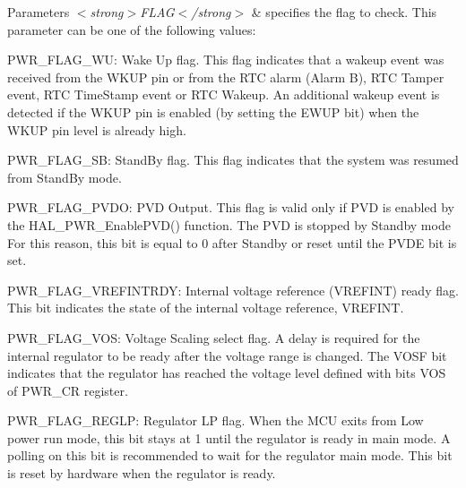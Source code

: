 \begin{DoxyParams}{Parameters}
{\em $<$strong$>$\-F\-L\-A\-G$<$/strong$>$} & specifies the flag to check. This parameter can be one of the following values\-: \begin{DoxyItemize}
\item P\-W\-R\-\_\-\-F\-L\-A\-G\-\_\-\-W\-U\-: Wake Up flag. This flag indicates that a wakeup event was received from the W\-K\-U\-P pin or from the R\-T\-C alarm (Alarm B), R\-T\-C Tamper event, R\-T\-C Time\-Stamp event or R\-T\-C Wakeup. An additional wakeup event is detected if the W\-K\-U\-P pin is enabled (by setting the E\-W\-U\-P bit) when the W\-K\-U\-P pin level is already high. \item P\-W\-R\-\_\-\-F\-L\-A\-G\-\_\-\-S\-B\-: Stand\-By flag. This flag indicates that the system was resumed from Stand\-By mode. \item P\-W\-R\-\_\-\-F\-L\-A\-G\-\_\-\-P\-V\-D\-O\-: P\-V\-D Output. This flag is valid only if P\-V\-D is enabled by the H\-A\-L\-\_\-\-P\-W\-R\-\_\-\-Enable\-P\-V\-D() function. The P\-V\-D is stopped by Standby mode For this reason, this bit is equal to 0 after Standby or reset until the P\-V\-D\-E bit is set. \item P\-W\-R\-\_\-\-F\-L\-A\-G\-\_\-\-V\-R\-E\-F\-I\-N\-T\-R\-D\-Y\-: Internal voltage reference (V\-R\-E\-F\-I\-N\-T) ready flag. This bit indicates the state of the internal voltage reference, V\-R\-E\-F\-I\-N\-T. \item P\-W\-R\-\_\-\-F\-L\-A\-G\-\_\-\-V\-O\-S\-: Voltage Scaling select flag. A delay is required for the internal regulator to be ready after the voltage range is changed. The V\-O\-S\-F bit indicates that the regulator has reached the voltage level defined with bits V\-O\-S of P\-W\-R\-\_\-\-C\-R register. \item P\-W\-R\-\_\-\-F\-L\-A\-G\-\_\-\-R\-E\-G\-L\-P\-: Regulator L\-P flag. When the M\-C\-U exits from Low power run mode, this bit stays at 1 until the regulator is ready in main mode. A polling on this bit is recommended to wait for the regulator main mode. This bit is reset by hardware when the regulator is ready. \end{DoxyItemize}
\\
\hline
\end{DoxyParams}

